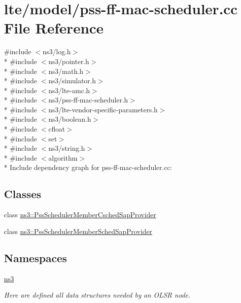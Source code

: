 \hypertarget{lte_2model_2pss-ff-mac-scheduler_8cc}{}\section{lte/model/pss-\/ff-\/mac-\/scheduler.cc File Reference}
\label{lte_2model_2pss-ff-mac-scheduler_8cc}
{\ttfamily \#include $<$ns3/log.\+h$>$}\\*
{\ttfamily \#include $<$ns3/pointer.\+h$>$}\\*
{\ttfamily \#include $<$ns3/math.\+h$>$}\\*
{\ttfamily \#include $<$ns3/simulator.\+h$>$}\\*
{\ttfamily \#include $<$ns3/lte-\/amc.\+h$>$}\\*
{\ttfamily \#include $<$ns3/pss-\/ff-\/mac-\/scheduler.\+h$>$}\\*
{\ttfamily \#include $<$ns3/lte-\/vendor-\/specific-\/parameters.\+h$>$}\\*
{\ttfamily \#include $<$ns3/boolean.\+h$>$}\\*
{\ttfamily \#include $<$cfloat$>$}\\*
{\ttfamily \#include $<$set$>$}\\*
{\ttfamily \#include $<$ns3/string.\+h$>$}\\*
{\ttfamily \#include $<$algorithm$>$}\\*
Include dependency graph for pss-\/ff-\/mac-\/scheduler.cc\+:
\subsection*{Classes}
\begin{DoxyCompactItemize}
\item 
class \hyperlink{classns3_1_1PssSchedulerMemberCschedSapProvider}{ns3\+::\+Pss\+Scheduler\+Member\+Csched\+Sap\+Provider}
\item 
class \hyperlink{classns3_1_1PssSchedulerMemberSchedSapProvider}{ns3\+::\+Pss\+Scheduler\+Member\+Sched\+Sap\+Provider}
\end{DoxyCompactItemize}
\subsection*{Namespaces}
\begin{DoxyCompactItemize}
\item 
 \hyperlink{namespacens3}{ns3}
\begin{DoxyCompactList}\small\item\em Here are defined all data structures needed by an O\+L\+SR node. \end{DoxyCompactList}\end{DoxyCompactItemize}
